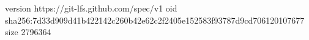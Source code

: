 version https://git-lfs.github.com/spec/v1
oid sha256:7d33d909d41b422142c260b42e62c2f2405e152583f93787d9cd706120107677
size 2796364
